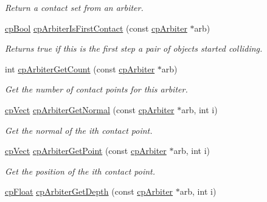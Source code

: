 \begin{DoxyCompactItemize}
\begin{DoxyCompactList}\small\item\em Return a contact set from an arbiter. \end{DoxyCompactList}\item 
\hypertarget{group__cp_arbiter_ga18fc6adcc84fb76806c244c7ed3fb8a2}{\hyperlink{group__basic_types_gab6e5d8afee598a57cd323abae5310244}{cp\-Bool} \hyperlink{group__cp_arbiter_ga18fc6adcc84fb76806c244c7ed3fb8a2}{cp\-Arbiter\-Is\-First\-Contact} (const \hyperlink{structcp_arbiter}{cp\-Arbiter} $\ast$arb)}\label{group__cp_arbiter_ga18fc6adcc84fb76806c244c7ed3fb8a2}

\begin{DoxyCompactList}\small\item\em Returns true if this is the first step a pair of objects started colliding. \end{DoxyCompactList}\item 
\hypertarget{group__cp_arbiter_gad9422ed6f170a552d00105b83c587827}{int \hyperlink{group__cp_arbiter_gad9422ed6f170a552d00105b83c587827}{cp\-Arbiter\-Get\-Count} (const \hyperlink{structcp_arbiter}{cp\-Arbiter} $\ast$arb)}\label{group__cp_arbiter_gad9422ed6f170a552d00105b83c587827}

\begin{DoxyCompactList}\small\item\em Get the number of contact points for this arbiter. \end{DoxyCompactList}\item 
\hypertarget{group__cp_arbiter_ga2b4aa4954df01a78004b02a135f03cec}{\hyperlink{structcp_vect}{cp\-Vect} \hyperlink{group__cp_arbiter_ga2b4aa4954df01a78004b02a135f03cec}{cp\-Arbiter\-Get\-Normal} (const \hyperlink{structcp_arbiter}{cp\-Arbiter} $\ast$arb, int i)}\label{group__cp_arbiter_ga2b4aa4954df01a78004b02a135f03cec}

\begin{DoxyCompactList}\small\item\em Get the normal of the {\ttfamily ith} contact point. \end{DoxyCompactList}\item 
\hypertarget{group__cp_arbiter_gacc822fd2e36734d6d51dc1b9e7f2b7b0}{\hyperlink{structcp_vect}{cp\-Vect} \hyperlink{group__cp_arbiter_gacc822fd2e36734d6d51dc1b9e7f2b7b0}{cp\-Arbiter\-Get\-Point} (const \hyperlink{structcp_arbiter}{cp\-Arbiter} $\ast$arb, int i)}\label{group__cp_arbiter_gacc822fd2e36734d6d51dc1b9e7f2b7b0}

\begin{DoxyCompactList}\small\item\em Get the position of the {\ttfamily ith} contact point. \end{DoxyCompactList}\item 
\hypertarget{group__cp_arbiter_ga1f06a3ea7a1ca61020cec1664887cbee}{\hyperlink{group__basic_types_gac1ed65573e035bf892505768c852d8d3}{cp\-Float} \hyperlink{group__cp_arbiter_ga1f06a3ea7a1ca61020cec1664887cbee}{cp\-Arbiter\-Get\-Depth} (const \hyperlink{structcp_arbiter}{cp\-Arbiter} $\ast$arb, int i)}\label{group__cp_arbiter_ga1f06a3ea7a1ca61020cec1664887cbee}


\end{DoxyCompactItemize}
